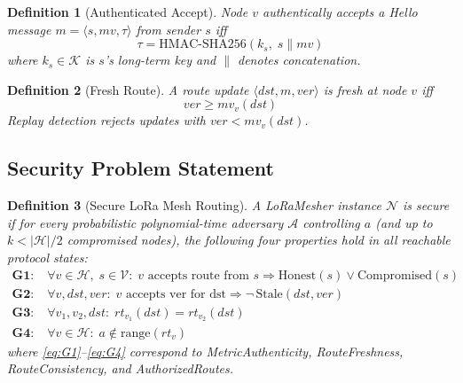 \documentclass[10pt,journal,compsoc]{IEEEtran}
\newtheorem{definition}{Definition}
\begin{document}
\begin{definition}[Authenticated Accept]
Node $v$ \emph{authentically accepts} a Hello message
$m = \langle s, mv, \tau \rangle$ from sender $s$ iff
\begin{equation}
  \tau = \mathrm{HMAC\text{-}SHA256}(k_s,\; s \| mv)
  \label{eq:hmac-hello}
\end{equation}
where $k_s \in \mathcal{K}$ is $s$'s long-term key and
$\|$ denotes concatenation.
\end{definition}

\begin{definition}[Fresh Route]
A route update $\langle \mathit{dst}, m, \mathit{ver} \rangle$
is \emph{fresh} at node $v$ iff
\begin{equation}
  \mathit{ver} \geq mv_v(\mathit{dst})
  \label{eq:freshness}
\end{equation}
Replay detection rejects updates with $\mathit{ver} < mv_v(\mathit{dst})$.
\end{definition}

\subsection{Security Problem Statement}

\begin{definition}[Secure LoRa Mesh Routing]
A LoRaMesher instance $\mathcal{N}$ is \emph{secure} if for every
probabilistic polynomial-time adversary $\mathcal{A}$ controlling
$a$ (and up to $k < |\mathcal{H}|/2$ compromised nodes), the
following four properties hold in all reachable protocol states:
\begin{align}
  \textbf{G1:}&\; \forall v \in \mathcal{H},\; s \in \mathcal{V}:\;
    v\text{ accepts route from }s
    \Rightarrow \mathrm{Honest}(s) \vee \mathrm{Compromised}(s)
    \label{eq:G1} \\
  \textbf{G2:}&\; \forall v,\mathit{dst},\mathit{ver}:\;
    v\text{ accepts ver for dst}
    \Rightarrow \neg\, \mathrm{Stale}(\mathit{dst}, \mathit{ver})
    \label{eq:G2} \\
  \textbf{G3:}&\; \forall v_1, v_2,\mathit{dst}:\;
    rt_{v_1}(\mathit{dst}) = rt_{v_2}(\mathit{dst})
    \label{eq:G3} \\
  \textbf{G4:}&\; \forall v \in \mathcal{H}:\;
    a \notin \mathrm{range}(rt_v)
    \label{eq:G4}
\end{align}
where \eqref{eq:G1}--\eqref{eq:G4} correspond to
MetricAuthenticity, RouteFreshness, RouteConsistency, and
AuthorizedRoutes.
\end{definition}
\end{document}
